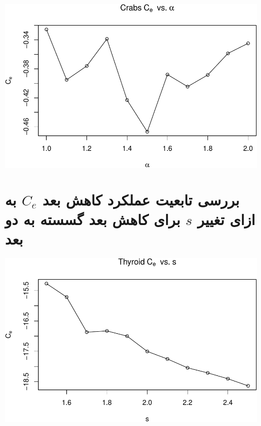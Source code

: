 \begin{center}\includegraphics[width=1\linewidth]{Report_files/figure-latex/unnamed-chunk-22-7} \end{center}

\section{
بررسی تابعیت عملکرد کاهش بعد $C_e$ به ازای تغییر $s$ برای کاهش بعد گسسته به دو بعد
}


\begin{center}\includegraphics[width=1\linewidth]{Report_files/figure-latex/unnamed-chunk-24-1} \end{center}

